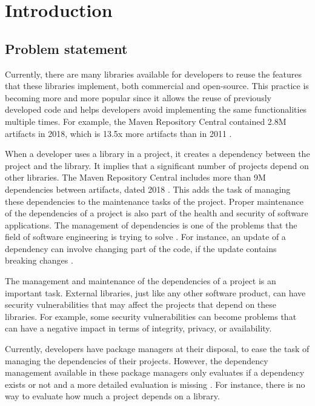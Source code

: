 \chapter{Introduction}\label{ch:Introduction}

\section{Problem statement}
Currently, there are many libraries available for developers to reuse the features that these libraries implement, both commercial and open-source. This practice is becoming more and more popular since it allows the reuse of previously developed code and helps developers avoid implementing the same functionalities multiple times. For example, the Maven Repository Central contained 2.8M artifacts in 2018, which is 13.5x more artifacts than in 2011  \cite{Benelallam2019}.

When a developer uses a library in a project, it creates a dependency between the project and the library. It implies that a significant number of projects depend on other libraries. The Maven Repository Central includes more than 9M dependencies between artifacts, dated 2018 \cite{Benelallam2019}. This adds the task of managing these dependencies to the maintenance tasks of the project. Proper maintenance of the dependencies of a project is also part of the health and security of software applications. The management of dependencies is one of the problems that the field of software engineering is trying to solve \cite{kula2014visualizing}. For instance, an update of a dependency can involve changing part of the code, if the update contains breaking changes \cite{Raemaekers2017}.

The management and maintenance of the dependencies of a project is an important task. External libraries, just like any other software product, can have security vulnerabilities that may affect the projects that depend on these libraries. For example, some security vulnerabilities can become problems that can have a negative impact in terms of integrity, privacy, or availability.

\blankl
Currently, developers have package managers at their disposal, to ease the task of managing the dependencies of their projects. However, the dependency management available in these package managers only evaluates if a dependency exists or not and a more detailed evaluation is missing \cite{hejderup2018prazi}. For instance, there is no way to evaluate how much a project depends on a library.

